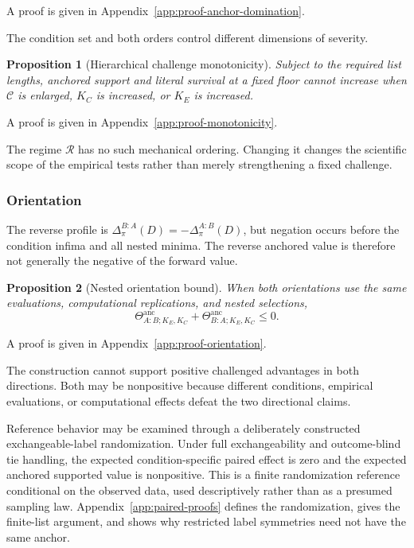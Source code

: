 \documentclass[11pt]{article}
\newcommand{\Regime}{\mathcal{R}}
\newcommand{\CSet}{\mathcal{C}}
\newcommand{\Thetaanc}{\Theta^{\mathrm{anc}}}
\newtheorem{proposition}{Proposition}
\theoremstyle{remark}
\begin{document}
A proof is given in Appendix~\ref{app:proof-anchor-domination}.

The condition set and both orders control different dimensions of severity.

\begin{proposition}[Hierarchical challenge monotonicity]
\label{prop:monotonicity}
Subject to the required list lengths, anchored support and literal survival at
a fixed floor cannot increase when $\CSet$ is enlarged, $K_C$ is increased, or
$K_E$ is increased.
\end{proposition}

A proof is given in Appendix~\ref{app:proof-monotonicity}.

The regime $\Regime$ has no such mechanical ordering. Changing it changes the
scientific scope of the empirical tests rather than merely strengthening a
fixed challenge.

\subsubsection{Orientation}

The reverse profile is
$\Delta^{B:A}_\pi(D)=-\Delta^{A:B}_\pi(D)$, but negation occurs before the
condition infima and all nested minima. The reverse anchored value is therefore
not generally the negative of the forward value.

\begin{proposition}[Nested orientation bound]
\label{prop:orientation}
When both orientations use the same evaluations, computational replications,
and nested selections,
\begin{equation}
\Thetaanc_{A:B;K_E,K_C}
+
\Thetaanc_{B:A;K_E,K_C}
\leq0.
\label{eq:orientation}
\end{equation}
\end{proposition}

A proof is given in Appendix~\ref{app:proof-orientation}.

The construction cannot support positive challenged advantages in both
directions. Both may be nonpositive because different conditions, empirical
evaluations, or computational effects defeat the two directional claims.

Reference behavior may be examined through a deliberately constructed
exchangeable-label randomization. Under full exchangeability and outcome-blind
tie handling, the expected condition-specific paired effect is zero and the
expected anchored supported value is nonpositive. This is a finite
randomization reference conditional on the observed data, used descriptively
rather than as a presumed sampling law. Appendix~\ref{app:paired-proofs}
defines the randomization, gives the finite-list argument, and shows why
restricted label symmetries need not have the same anchor.
\end{document}
